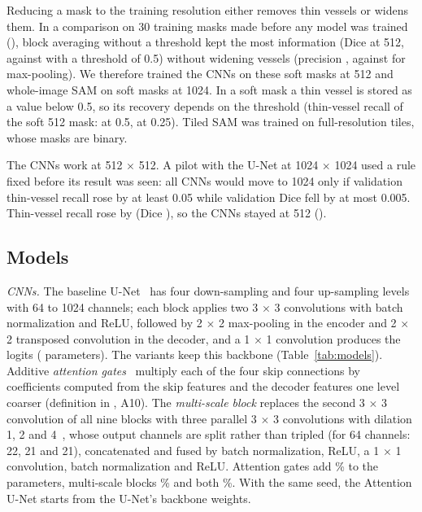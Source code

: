 Reducing a mask to the training resolution either removes thin vessels or widens them. In a comparison on 30 training
masks made before any model was trained (), block averaging without a threshold kept the most
information (Dice \ResizeFiveSoftDice{} at 512, against \ResizeFiveAreaHalfDice{} with a threshold of 0.5) without widening
vessels (precision \ResizeFiveSoftPrec, against \ResizeFiveMaxpoolPrec{} for max-pooling). We therefore trained the CNNs on
these soft masks at 512 and whole-image SAM on soft masks at 1024. In a soft mask a thin vessel is stored as a value below
0.5, so its recovery depends on the threshold (thin-vessel recall of the soft 512 mask: \ResizeFiveSoftThin{} at 0.5,
\ResizeFiveSoftQuarterThin{} at 0.25). Tiled SAM was trained on full-resolution tiles, whose masks are binary.

The CNNs work at 512 $\times$ 512. A pilot with the U-Net at 1024 $\times$ 1024 used a rule fixed before its result was seen:
all CNNs would move to 1024 only if validation thin-vessel recall rose by at least 0.05 while validation Dice fell by at most
0.005. Thin-vessel recall rose by \PilotThinGain{} (Dice \PilotDiceGain), so the CNNs stayed at 512 ().

\subsection*{Models}
\emph{CNNs.} The baseline U-Net~\cite{ronneberger2015unet} has four down-sampling and four up-sampling levels with 64 to
1024 channels; each block applies two 3 $\times$ 3 convolutions with batch normalization and ReLU, followed by
2 $\times$ 2 max-pooling in the encoder and 2 $\times$ 2 transposed convolution in the decoder, and a 1 $\times$ 1
convolution produces the logits (\UNetParams{} parameters). The variants keep this backbone (Table~\ref{tab:models}).
Additive \emph{attention gates}~\cite{oktay2018attention} multiply each of the four skip connections by coefficients
computed from the skip features and the decoder features one level coarser (definition in , A10).
The \emph{multi-scale block} replaces the second 3 $\times$ 3 convolution
of all nine blocks with three parallel 3 $\times$ 3 convolutions with dilation 1, 2 and 4~\cite{yu2016dilated}, whose
output channels are split rather than tripled (for 64 channels: 22, 21 and 21), concatenated and fused by batch
normalization, ReLU, a 1 $\times$ 1 convolution, batch normalization and ReLU. Attention gates add \AttParamsPct\% to the
parameters, multi-scale blocks \MSParamsPct\% and both \MSAttParamsPct\%. With the same seed, the Attention U-Net starts
from the U-Net's backbone weights.

